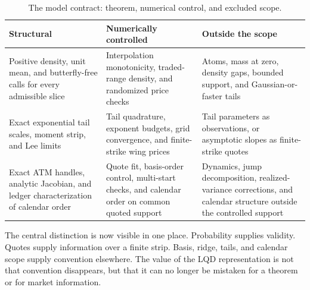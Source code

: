\begin{table}[htbp]
\centering\small
\begin{tabular}{@{}>{\raggedright\arraybackslash}p{}
>{\raggedright\arraybackslash}p{}
>{\raggedright\arraybackslash}p{}@{}}
\toprule
\textbf{Structural} & \textbf{Numerically controlled} &
\textbf{Outside the scope}\\
\midrule
Positive density, unit mean, and butterfly-free calls for every admissible
slice & Interpolation monotonicity, traded-range density, and randomized
price checks & Atoms, mass at zero, density gaps, bounded support, and
Gaussian-or-faster tails\\[4pt]
Exact exponential tail scales, moment strip, and Lee limits & Tail
quadrature, exponent budgets, grid convergence, and finite-strike wing prices
& Tail parameters as observations, or asymptotic slopes as finite-strike
quotes\\[4pt]
Exact ATM handles, analytic Jacobian, and ledger characterization of calendar
order & Quote fit, basis-order control, multi-start checks, and calendar order
on common quoted support & Dynamics, jump decomposition, realized-variance
corrections, and calendar structure outside the controlled support\\
\bottomrule
\end{tabular}
\caption{The model contract: theorem, numerical control, and excluded scope.}
\label{tab:contract}
\end{table}

The central distinction is now visible in one place.  Probability supplies
validity.  Quotes supply information over a finite strip.  Basis, ridge,
tails, and calendar scope supply convention elsewhere.  The value of the LQD
representation is not that convention disappears, but that it can no longer
be mistaken for a theorem or for market information.
